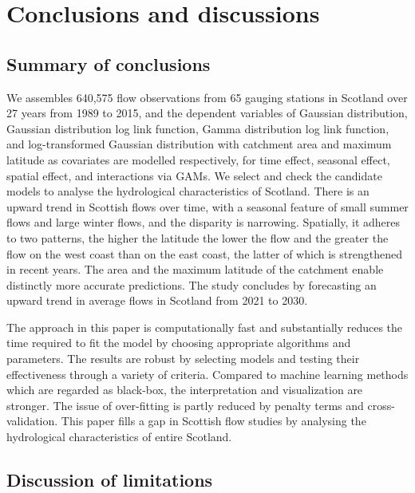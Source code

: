 \documentclass[12pt,oneside]{reedthesis}
\begin{document}
\hypertarget{conclusion}{%
\chapter{Conclusions and discussions}\label{conclusion}}

\hypertarget{summary-of-conclusions}{%
\section{Summary of conclusions}\label{summary-of-conclusions}}

We assembles 640,575 flow observations from 65 gauging stations in Scotland over 27 years from 1989 to 2015, and the dependent variables of Gaussian distribution, Gaussian distribution log link function, Gamma distribution log link function, and log-transformed Gaussian distribution with catchment area and maximum latitude as covariates are modelled respectively, for time effect, seasonal effect, spatial effect, and interactions via GAMs. We select and check the candidate models to analyse the hydrological characteristics of Scotland. There is an upward trend in Scottish flows over time, with a seasonal feature of small summer flows and large winter flows, and the disparity is narrowing. Spatially, it adheres to two patterns, the higher the latitude the lower the flow and the greater the flow on the west coast than on the east coast, the latter of which is strengthened in recent years. The area and the maximum latitude of the catchment enable distinctly more accurate predictions. The study concludes by forecasting an upward trend in average flows in Scotland from 2021 to 2030.

The approach in this paper is computationally fast and substantially reduces the time required to fit the model by choosing appropriate algorithms and parameters. The results are robust by selecting models and testing their effectiveness through a variety of criteria. Compared to machine learning methods which are regarded as black-box, the interpretation and visualization are stronger. The issue of over-fitting is partly reduced by penalty terms and cross-validation. This paper fills a gap in Scottish flow studies by analysing the hydrological characteristics of entire Scotland.

\hypertarget{discussion-of-limitations}{%
\section{Discussion of limitations}\label{discussion-of-limitations}}
\end{document}
